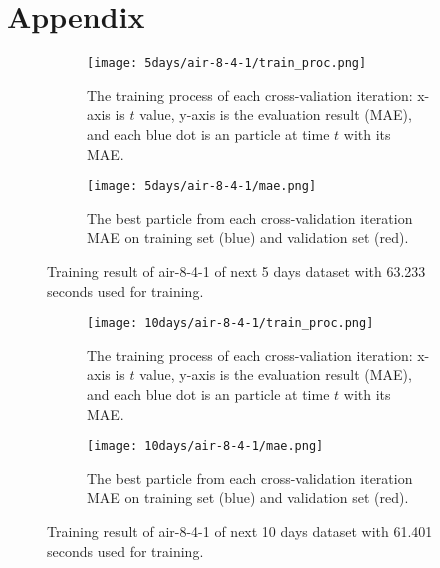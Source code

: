 \renewcommand{\listingscaption}{Source Code}
\newenvironment{code}{\captionsetup{type=listing}}{}
\section*{Appendix}

\begin{figure}[htp]
    \begin{subfigure}{\textwidth}  
        \centering
        \texttt{[image: 5days/air-8-4-1/train\_proc.png]}
        \caption{The training process of each cross-valiation iteration: x-axis is $t$ value, y-axis is the evaluation result (MAE), 
        and each blue dot is an particle at time $t$ with its MAE.}
        \label{fig:2a}
    \end{subfigure}
    \begin{subfigure}{\textwidth}  
        \centering
        \texttt{[image: 5days/air-8-4-1/mae.png]}
        \caption{The best particle from each cross-validation iteration MAE on training set (blue) and validation set (red).}
        \label{fig:2b}
    \end{subfigure}
    \caption{Training result of air-8-4-1 of next 5 days dataset with 63.233 seconds used for training.}
    \label{fig:2}
\end{figure}
\FloatBarrier

\begin{figure}[htp]
    \begin{subfigure}{\textwidth}  
        \centering
        \texttt{[image: 10days/air-8-4-1/train\_proc.png]}
        \caption{The training process of each cross-valiation iteration: x-axis is $t$ value, y-axis is the evaluation result (MAE), 
        and each blue dot is an particle at time $t$ with its MAE.}
        \label{fig:3a}
    \end{subfigure}
    \begin{subfigure}{\textwidth}  
        \centering
        \texttt{[image: 10days/air-8-4-1/mae.png]}
        \caption{The best particle from each cross-validation iteration MAE on training set (blue) and validation set (red).}
        \label{fig:3b}
    \end{subfigure}
    \caption{Training result of air-8-4-1 of next 10 days dataset with 61.401 seconds used for training.}
    \label{fig:3}
\end{figure}
\FloatBarrier

